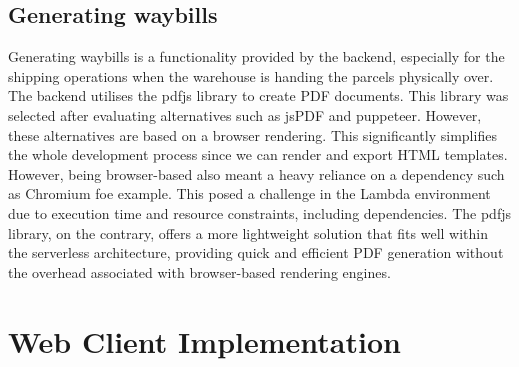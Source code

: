 \subsection{Generating waybills}

Generating waybills is a functionality provided by the backend, especially for the shipping operations when the warehouse is handing the parcels physically over.
The backend utilises the \gls{pdfjs} library to create PDF documents.
This library was selected after evaluating alternatives such as \gls{jsPDF} and \gls{puppeteer}.
However, these alternatives are based on a browser rendering.
This significantly simplifies the whole development process since we can render and export HTML templates.
However, being browser-based also meant a heavy reliance on a dependency such as \Gls{Chromium} foe example. 
This posed a challenge in the Lambda environment due to execution time and resource constraints, including dependencies.
The \gls{pdfjs} library, on the contrary, offers a more lightweight solution that fits well within the serverless architecture, providing quick and efficient PDF generation without the overhead associated with browser-based rendering engines.

\section{Web Client Implementation}
\label{sec:web-client-implementation}


